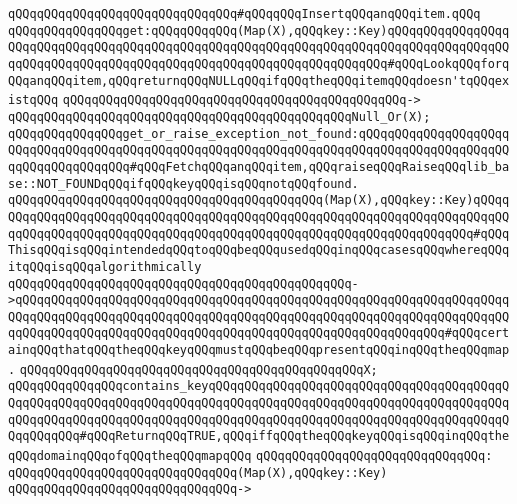 \verb|qQQqqQQqqQQqqQQqqQQqqQQqqQQqqQQq#qQQqqQQqInsertqQQqanqQQqitem.qQQq|\newline
\newline
\verb|qQQqqQQqqQQqqQQqget:qQQqqQQqqQQq(Map(X),qQQqkey::Key)qQQqqQQqqQQqqQQqqQQqqQQqqQQqqQQqqQQqqQQqqQQqqQQqqQQqqQQqqQQqqQQqqQQqqQQqqQQqqQQqqQQqqQQqqQQqqQQqqQQqqQQqqQQqqQQqqQQqqQQqqQQqqQQqqQQqqQQqqQQq#qQQqLookqQQqforqQQqanqQQqitem,qQQqreturnqQQqNULLqQQqifqQQqtheqQQqitemqQQqdoesn'tqQQqexistqQQq|\newline
\verb|qQQqqQQqqQQqqQQqqQQqqQQqqQQqqQQqqQQqqQQqqQQqqQQq->|\newline
\verb|qQQqqQQqqQQqqQQqqQQqqQQqqQQqqQQqqQQqqQQqqQQqqQQqNull_Or(X);|\newline
\newline
\verb|qQQqqQQqqQQqqQQqget_or_raise_exception_not_found:qQQqqQQqqQQqqQQqqQQqqQQqqQQqqQQqqQQqqQQqqQQqqQQqqQQqqQQqqQQqqQQqqQQqqQQqqQQqqQQqqQQqqQQqqQQqqQQqqQQqqQQqqQQq#qQQqFetchqQQqanqQQqitem,qQQqraiseqQQqRaiseqQQqlib_base::NOT_FOUNDqQQqifqQQqkeyqQQqisqQQqnotqQQqfound.|\newline
\verb|qQQqqQQqqQQqqQQqqQQqqQQqqQQqqQQqqQQqqQQqqQQq(Map(X),qQQqkey::Key)qQQqqQQqqQQqqQQqqQQqqQQqqQQqqQQqqQQqqQQqqQQqqQQqqQQqqQQqqQQqqQQqqQQqqQQqqQQqqQQqqQQqqQQqqQQqqQQqqQQqqQQqqQQqqQQqqQQqqQQqqQQqqQQqqQQqqQQqqQQq#qQQqThisqQQqisqQQqintendedqQQqtoqQQqbeqQQqusedqQQqinqQQqcasesqQQqwhereqQQqitqQQqisqQQqalgorithmically|\newline
\verb|qQQqqQQqqQQqqQQqqQQqqQQqqQQqqQQqqQQqqQQqqQQqqQQq->qQQqqQQqqQQqqQQqqQQqqQQqqQQqqQQqqQQqqQQqqQQqqQQqqQQqqQQqqQQqqQQqqQQqqQQqqQQqqQQqqQQqqQQqqQQqqQQqqQQqqQQqqQQqqQQqqQQqqQQqqQQqqQQqqQQqqQQqqQQqqQQqqQQqqQQqqQQqqQQqqQQqqQQqqQQqqQQqqQQqqQQqqQQqqQQqqQQqqQQq#qQQqcertainqQQqthatqQQqtheqQQqkeyqQQqmustqQQqbeqQQqpresentqQQqinqQQqtheqQQqmap.|\newline
\verb|qQQqqQQqqQQqqQQqqQQqqQQqqQQqqQQqqQQqqQQqqQQqqQQqX;|\newline
\newline
\verb|qQQqqQQqqQQqqQQqcontains_keyqQQqqQQqqQQqqQQqqQQqqQQqqQQqqQQqqQQqqQQqqQQqqQQqqQQqqQQqqQQqqQQqqQQqqQQqqQQqqQQqqQQqqQQqqQQqqQQqqQQqqQQqqQQqqQQqqQQqqQQqqQQqqQQqqQQqqQQqqQQqqQQqqQQqqQQqqQQqqQQqqQQqqQQqqQQqqQQqqQQqqQQqqQQqqQQq#qQQqReturnqQQqTRUE,qQQqiffqQQqtheqQQqkeyqQQqisqQQqinqQQqtheqQQqdomainqQQqofqQQqtheqQQqmapqQQq|\newline
\verb|qQQqqQQqqQQqqQQqqQQqqQQqqQQqqQQq:|\newline
\verb|qQQqqQQqqQQqqQQqqQQqqQQqqQQqqQQq(Map(X),qQQqkey::Key)|\newline
\verb|qQQqqQQqqQQqqQQqqQQqqQQqqQQqqQQq->|\newline
